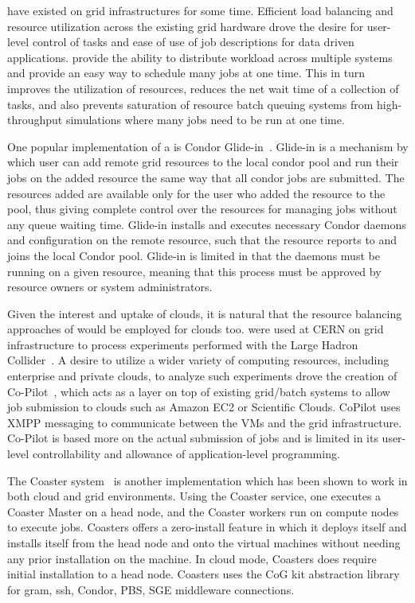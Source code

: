 \documentclass{sig-alternate}
\begin{document}
\pilotjobs have existed on grid infrastructures for some time. 
Efficient load balancing and resource utilization
across the existing grid hardware drove the desire for 
user-level control of tasks and ease of use of job descriptions for
data driven applications.  \pilotjobs provide the ability to 
distribute workload across multiple systems and
provide an easy way to schedule many jobs at one time. This in turn
improves the utilization of resources, reduces the net wait time of a
collection of tasks, and also prevents saturation of resource batch
queuing systems from high-throughput simulations where many jobs
need to be run at one time.

One popular implementation of a \pilotjob is Condor Glide-in~\cite{glidein}. Glide-in is a mechanism by which user can add remote grid resources to the local condor pool and run their jobs on the added resource the same way that all condor jobs are submitted. The resources added are available only for the user who added the resource to the pool, thus giving complete control over the resources for managing jobs without any queue waiting time. Glide-in installs and executes necessary Condor daemons and configuration on the remote resource, such that the resource reports to and joins the local Condor pool. Glide-in is limited in that the daemons must be running on a given resource, meaning that this process must be approved by resource owners or system administrators. 

Given the interest and uptake of clouds, it is natural that the resource
balancing approaches of \pilotjobs would be employed for clouds too.
\pilotjobs were used at CERN on grid infrastructure to process experiments 
performed with the Large Hadron Collider~\cite{copilot-tr}. 
A desire to utilize a wider variety of computing resources, including enterprise and private clouds, to analyze such experiments drove the creation 
of  Co-Pilot~\cite{copilot-tr}, which acts as a layer on top of existing
grid/batch systems to allow job submission to clouds such as Amazon
EC2 or Scientific Clouds. CoPilot uses XMPP messaging to communicate between
the VMs and the grid infrastructure. Co-Pilot is based more on the actual
submission of jobs and is limited in its user-level controllability and 
allowance of application-level programming.

The Coaster system~\cite{coasters} is another \pilotjob implementation
which has been shown to work in both cloud and grid
environments. Using the Coaster service, one executes a Coaster Master
on a head node, and the Coaster workers run on compute nodes to
execute jobs. Coasters offers a zero-install feature in which it
deploys itself and installs itself from the head node and onto the
virtual machines without needing any prior installation on the
machine. In cloud mode, Coasters does require initial installation to
a head node. Coasters uses the CoG kit abstraction library for gram,
ssh, Condor, PBS, SGE middleware connections.
 
\end{document}
